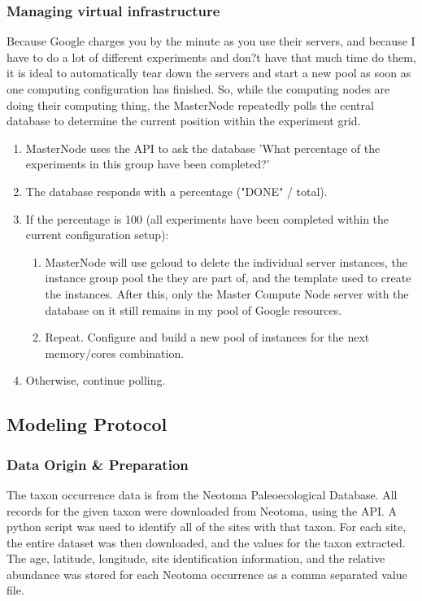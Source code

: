 \documentclass[a4paper]{article}
\begin{document}
\subsubsection{Managing virtual infrastructure}
Because Google charges you by the minute as you use their servers, and because I have to do a lot of different experiments and don?t have that much time do them, it is ideal to automatically tear down the servers and start a new pool as soon as one computing configuration has finished. So, while the computing nodes are doing their computing thing, the MasterNode repeatedly polls the central database to determine the current position within the experiment grid.
\begin{enumerate}
\item MasterNode uses the API to ask the database 'What percentage of the experiments in this group have been completed?'
\item The database responds with a percentage ("DONE" / total).
\item If the percentage is 100 (all experiments have been completed within the current configuration setup):
\begin{enumerate}
\item MasterNode will use gcloud to delete the individual server instances, the instance group pool the they are part of, and the template used to create the instances. After this, only the Master Compute Node server with the database on it still remains in my pool of Google resources. 
\item Repeat.  Configure and build a new pool of instances for the next memory/cores combination.
\end{enumerate}
\item Otherwise, continue polling.
\end{enumerate}

\subsection{Modeling Protocol }
\subsubsection{Data Origin \& Preparation}
The taxon occurrence data is from the Neotoma Paleoecological Database.  All records for the given taxon were downloaded from Neotoma, using the API.  A python script was used to identify all of the sites with that taxon.  For each site, the entire dataset was then downloaded, and the values for the taxon extracted.  The age, latitude, longitude, site identification information, and the relative abundance was stored for each Neotoma occurrence as a comma separated value file.
\end{document}

